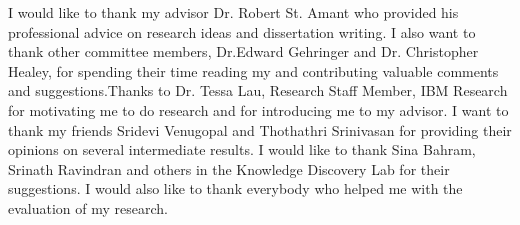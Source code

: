 \begin{acknowledgements}

I would like to thank my advisor Dr. Robert St. Amant who provided his professional advice on research ideas and dissertation writing. I also want to thank other committee members, Dr.Edward Gehringer and Dr. Christopher Healey,  for spending their time reading my  and contributing valuable comments and suggestions.Thanks to Dr. Tessa Lau, Research Staff Member, IBM Research for motivating me to do research and for introducing me to my advisor. I want to thank my friends Sridevi Venugopal and Thothathri Srinivasan for providing their opinions on several intermediate results. I would like to thank Sina Bahram, Srinath Ravindran and others in the Knowledge Discovery Lab for their suggestions. I would also like to thank everybody who helped me with the evaluation of my research.

\end{acknowledgements}


\thesistableofcontents

\thesislistoftables

\thesislistoffigures
